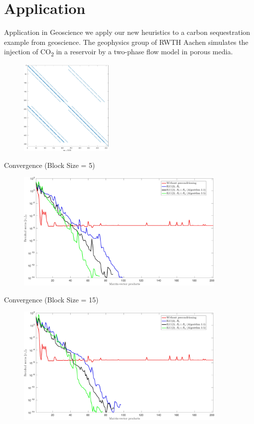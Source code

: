 \documentclass{beamer}
\begin{document}
\section{Application}
\begin{frame}{Application in Geoscience}
we apply our new heuristics to a carbon sequestration example from geoscience.
The geophysics group of RWTH Aachen simulates the injection of CO\textsubscript{2} in a reservoir by a
two-phase flow model in porous media.
\begin{figure}
\centering
\includegraphics[width=0.4\textwidth]{co2_jac}
\end{figure}
\end{frame}

\begin{frame}{Convergence (Block Size = 5)}
\begin{figure}
\centering
\includegraphics[width=0.9\textwidth]{jac_convergence_greedy_new_5}
\end{figure}
\end{frame}

\begin{frame}{Convergence (Block Size = 15)}
\begin{figure}
\centering
\includegraphics[width=0.9\textwidth]{jac_convergence_greedy_new_15}
\end{figure}
\end{frame}
\end{document}
